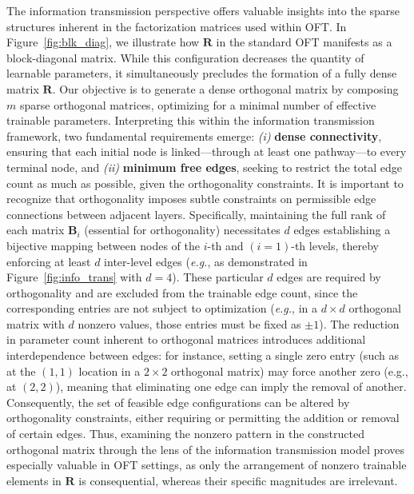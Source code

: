 The information transmission perspective offers valuable insights into the sparse structures inherent in the factorization matrices used within OFT. In Figure~\ref{fig:blk_diag}, we illustrate how $\bm{R}$ in the standard OFT manifests as a block-diagonal matrix. While this configuration decreases the quantity of learnable parameters, it simultaneously precludes the formation of a fully dense matrix $\bm{R}$. Our objective is to generate a dense orthogonal matrix by composing $m$ sparse orthogonal matrices, optimizing for a minimal number of effective trainable parameters. Interpreting this within the information transmission framework, two fundamental requirements emerge: \emph{(i)} \textbf{dense connectivity}, ensuring that each initial node is linked—through at least one pathway—to every terminal node, and \emph{(ii)} \textbf{minimum free edges}, seeking to restrict the total edge count as much as possible, given the orthogonality constraints. It is important to recognize that orthogonality imposes subtle constraints on permissible edge connections between adjacent layers. Specifically, maintaining the full rank of each matrix $\bm{B}_i$ (essential for orthogonality) necessitates $d$ edges establishing a bijective mapping between nodes of the $i$-th and $(i=1)$-th levels, thereby enforcing at least $d$ inter-level edges (\emph{e.g.}, as demonstrated in Figure~\ref{fig:info_trans} with $d=4$). These particular $d$ edges are required by orthogonality and are excluded from the trainable edge count, since the corresponding entries are not subject to optimization (\emph{e.g.}, in a $d\times d$ orthogonal matrix with $d$ nonzero values, those entries must be fixed as $\pm 1$). The reduction in parameter count inherent to orthogonal matrices introduces additional interdependence between edges: for instance, setting a single zero entry (such as at the $(1,1)$ location in a $2\times 2$ orthogonal matrix) may force another zero (e.g., at $(2,2)$), meaning that eliminating one edge can imply the removal of another. Consequently, the set of feasible edge configurations can be altered by orthogonality constraints, either requiring or permitting the addition or removal of certain edges. Thus, examining the nonzero pattern in the constructed orthogonal matrix through the lens of the information transmission model proves especially valuable in OFT settings, as only the arrangement of nonzero trainable elements in $\bm{R}$ is consequential, whereas their specific magnitudes are irrelevant.

